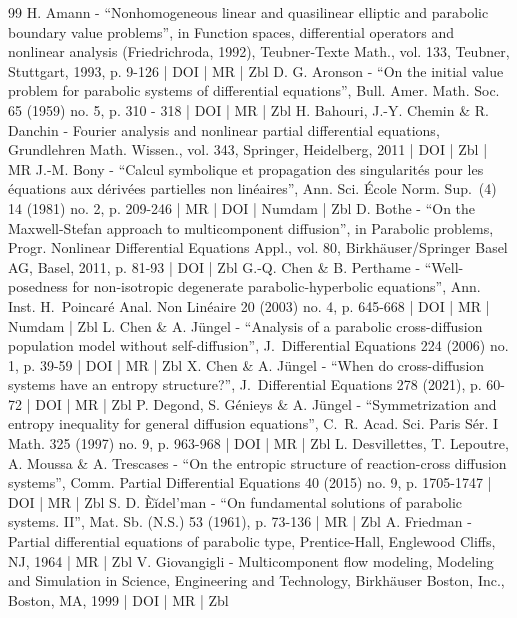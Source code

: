 \documentclass[10pt]{amsart}
\theoremstyle{definition}
\begin{document}
\begin{thebibliography}{99}
H. Amann - “Nonhomogeneous linear and quasilinear elliptic and parabolic boundary value problems”, in Function spaces, differential operators and nonlinear analysis (Friedrichroda, 1992), Teubner-Texte Math., vol. 133, Teubner, Stuttgart, 1993, p. 9-126 | DOI | MR | Zbl
D. G. Aronson - “On the initial value problem for parabolic systems of differential equations”, Bull. Amer. Math. Soc. 65 (1959) no. 5, p. 310 - 318 | DOI | MR | Zbl
H. Bahouri, J.-Y. Chemin \& R. Danchin - Fourier analysis and nonlinear partial differential equations, Grundlehren Math. Wissen., vol. 343, Springer, Heidelberg, 2011 | DOI | Zbl | MR
J.-M. Bony - “Calcul symbolique et propagation des singularités pour les équations aux dérivées partielles non linéaires”, Ann. Sci. École Norm. Sup. (4) 14 (1981) no. 2, p. 209-246 | MR | DOI | Numdam | Zbl
D. Bothe - “On the Maxwell-Stefan approach to multicomponent diffusion”, in Parabolic problems, Progr. Nonlinear Differential Equations Appl., vol. 80, Birkhäuser/Springer Basel AG, Basel, 2011, p. 81-93 | DOI | Zbl
G.-Q. Chen \& B. Perthame - “Well-posedness for non-isotropic degenerate parabolic-hyperbolic equations”, Ann. Inst. H. Poincaré Anal. Non Linéaire 20 (2003) no. 4, p. 645-668 | DOI | MR | Numdam | Zbl
L. Chen \& A. Jüngel - “Analysis of a parabolic cross-diffusion population model without self-diffusion”, J. Differential Equations 224 (2006) no. 1, p. 39-59 | DOI | MR | Zbl
X. Chen \& A. Jüngel - “When do cross-diffusion systems have an entropy structure?”, J. Differential Equations 278 (2021), p. 60-72 | DOI | MR | Zbl
P. Degond, S. Génieys \& A. Jüngel - “Symmetrization and entropy inequality for general diffusion equations”, C. R. Acad. Sci. Paris Sér. I Math. 325 (1997) no. 9, p. 963-968 | DOI | MR | Zbl
L. Desvillettes, T. Lepoutre, A. Moussa \& A. Trescases - “On the entropic structure of reaction-cross diffusion systems”, Comm. Partial Differential Equations 40 (2015) no. 9, p. 1705-1747 | DOI | MR | Zbl
S. D. Èĭdel’man - “On fundamental solutions of parabolic systems. II”, Mat. Sb. (N.S.) 53 (1961), p. 73-136 | MR | Zbl
A. Friedman - Partial differential equations of parabolic type, Prentice-Hall, Englewood Cliffs, NJ, 1964 | MR | Zbl
V. Giovangigli - Multicomponent flow modeling, Modeling and Simulation in Science, Engineering and Technology, Birkhäuser Boston, Inc., Boston, MA, 1999 | DOI | MR | Zbl

\end{thebibliography}
\end{document}
